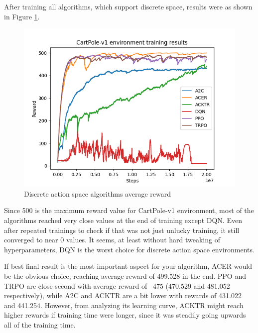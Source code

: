 \documentclass[12pt, a4paper]{article}
\begin{document}
After training all algorithms, which support discrete space, results were as shown in Figure \ref{DiscreteRewardsGraph}.
\begin{figure}[H]
    \centering
    \includegraphics[width=1\linewidth]{images/cartpole_results.png}
    \caption{Discrete action space algorithms average reward}
    \label{DiscreteRewardsGraph}
\end{figure}

Since 500 is the maximum reward value for CartPole-v1 environment, most of the algorithms reached very close values at the end of training except DQN. Even after repeated trainings to check if that was not just unlucky training, it still converged to near 0 values. It seems, at least without hard tweaking of hyperparameters, DQN is the worst choice for discrete action space environments. 

If best final result is the most important aspect for your algorithm, ACER would be the obvious choice, reaching average reward of 499.528 in the end. PPO and TRPO are close second with average reward of ~475 (470.529 and 481.052 respectively), while A2C and ACKTR are a bit lower with rewards of 431.022 and 441.254. However, from analyzing its learning curve, ACKTR might reach higher rewards if training time were longer, since it was steadily going upwards all of the training time.
\end{document}
